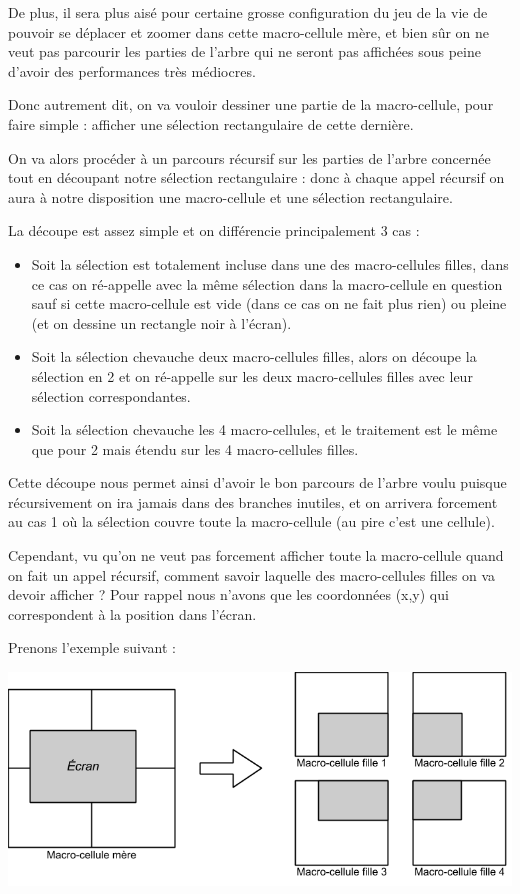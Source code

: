 \documentclass[a4paper,12pt]{report}
\begin{document}
\medskip

De plus, il sera plus aisé pour certaine grosse configuration du jeu
de la vie de pouvoir se déplacer et zoomer dans cette macro-cellule
mère, et bien sûr on ne veut pas parcourir les parties de l'arbre qui
ne seront pas affichées sous peine d'avoir des performances très
médiocres.

Donc autrement dit, on va vouloir dessiner une partie de la
macro-cellule, pour faire simple : afficher une sélection
rectangulaire de cette dernière.

On va alors procéder à un parcours récursif sur les parties de l'arbre
concernée tout en découpant notre sélection rectangulaire : donc à
chaque appel récursif on aura à notre disposition une macro-cellule et
une sélection rectangulaire.

La découpe est assez simple et on différencie principalement 3 cas :
\begin{itemize}
\item Soit la sélection est totalement incluse dans une des
  macro-cellules filles, dans ce cas on ré-appelle avec la même
  sélection dans la macro-cellule en question sauf si cette
  macro-cellule est vide (dans ce cas on ne fait plus rien) ou pleine
  (et on dessine un rectangle noir à l'écran).
\item Soit la sélection chevauche deux macro-cellules filles, alors on
  découpe la sélection en 2 et on ré-appelle sur les deux
  macro-cellules filles avec leur sélection correspondantes.
\item Soit la sélection chevauche les 4 macro-cellules, et le
  traitement est le même que pour 2 mais étendu sur les 4
  macro-cellules filles.
\end{itemize}
Cette découpe nous permet ainsi d'avoir le bon parcours de l'arbre
voulu puisque récursivement on ira jamais dans des branches inutiles,
et on arrivera forcement au cas 1 où la sélection couvre toute la
macro-cellule (au pire c'est une cellule).

Cependant, vu qu'on ne veut pas forcement afficher toute la
macro-cellule quand on fait un appel récursif, comment savoir laquelle
des macro-cellules filles on va devoir afficher ? Pour rappel nous
n'avons que les coordonnées (x,y) qui correspondent à la position dans
l'écran.

\medskip

Prenons l'exemple suivant :


\begin{center}
  \includegraphics[scale=0.5]{decoupage_graphique.png}
\end{center}
\end{document}
